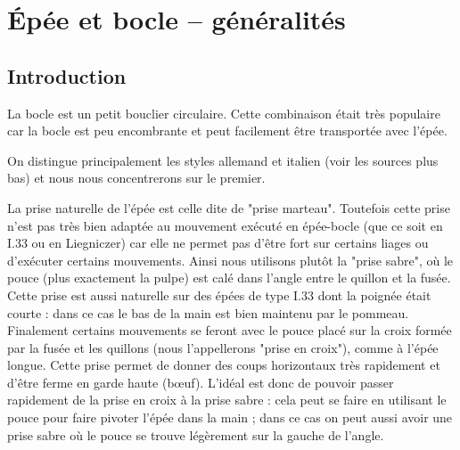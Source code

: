 \chapter{Épée et bocle -- généralités}


\section{Introduction}




La bocle est un petit bouclier circulaire.
Cette combinaison était très populaire car la bocle est peu encombrante et peut facilement être transportée avec l'épée.

On distingue principalement les styles allemand et italien (voir les sources plus bas) et nous nous concentrerons sur le premier.



La prise naturelle de l'épée est celle dite de "prise marteau".
Toutefois cette prise n'est pas très bien adaptée au mouvement exécuté en épée-bocle (que ce soit en I.33 ou en Liegniczer) car elle ne permet pas d'être fort sur certains liages ou d'exécuter certains mouvements.
Ainsi nous utilisons plutôt la "prise sabre", où le pouce (plus exactement la pulpe) est calé dans l'angle entre le quillon et la fusée.
Cette prise est aussi naturelle sur des épées de type I.33 dont la poignée était courte : dans ce cas le bas de la main est bien maintenu par le pommeau.
Finalement certains mouvements se feront avec le pouce placé sur la croix formée par la fusée et les quillons (nous l'appellerons "prise en croix"), comme à l'épée longue.
Cette prise permet de donner des coups horizontaux très rapidement et d'être ferme en garde haute (bœuf).
L'idéal est donc de pouvoir passer rapidement de la prise en croix à la prise sabre : cela peut se faire en utilisant le pouce pour faire pivoter l'épée dans la main ; dans ce cas on peut aussi avoir une prise sabre où le pouce se trouve légèrement sur la gauche de l'angle.

